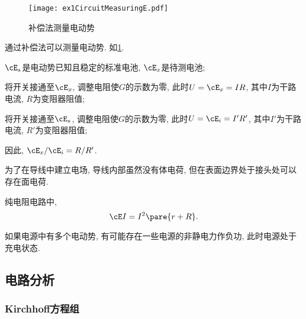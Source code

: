 \documentclass[../Electromagnetism.tex]{subfiles}
\begin{document}
\begin{figure}
	\centering
	\texttt{[image: ex1CircuitMeasuringE.pdf]}
	\caption{补偿法测量电动势}
	\label{fig:补偿法测量电动势}
\end{figure}
通过补偿法可以测量电动势. 如\cref{fig:补偿法测量电动势}.
\begin{cenum}
	\item $\cE_s$是电动势已知且稳定的标准电池, $\cE_x$是待测电池;
	\item 将开关接通至$\cE_x$, 调整电阻使$G$的示数为零, 此时$U=\cE_x=IR$, 其中$I$为干路电流, $R$为变阻器阻值;
	\item 将开关接通至$\cE_s$, 调整电阻使$G$的示数为零, 此时$U=\cE_i=I'R'$, 其中$I'$为干路电流, $R'$为变阻器阻值;
	\item 因此, $\cE_x/\cE_i = R/R'$.
\end{cenum}
\begin{remark}
	为了在导线中建立电场, 导线内部虽然没有体电荷, 但在表面边界处于接头处可以存在面电荷.
\end{remark}
\begin{corollary}[直流电路的能量转换]
	纯电阻电路中,
	\[ \cE I = I^2 \pare{r+R}. \]
\end{corollary}
\begin{remark}
	如果电源中有多个电动势, 有可能存在一些电源的非静电力作负功, 此时电源处于充电状态.
\end{remark}



\subsection{电路分析} %
\label{sub:电路分析}

\subsubsection{Kirchhoff方程组} %
\label{ssub:kirchhoff方程组}
\end{document}
